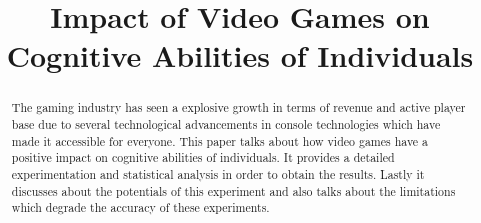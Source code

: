\documentclass[conference]{IEEEtran}
\begin{document}
\title{Impact of Video Games on Cognitive Abilities of Individuals}

\author{
\and
{}
}

\maketitle

\begin{abstract}
The gaming industry has seen a explosive growth in terms of revenue and active player base due to several technological advancements in console technologies which have made it accessible for everyone. This paper talks about how video games have a positive impact on cognitive abilities of individuals. It provides a detailed experimentation and statistical analysis in order to obtain the results. Lastly it discusses about the potentials of this experiment and also talks about the limitations which degrade the accuracy of these experiments.

\end{abstract}
\end{document}
